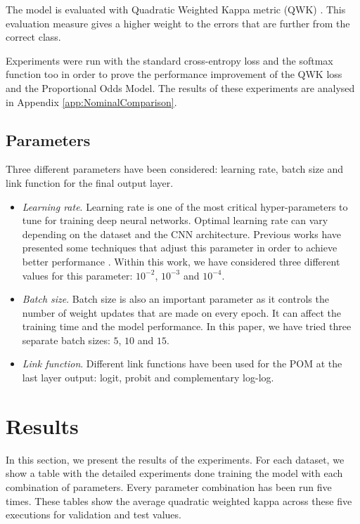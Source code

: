 \documentclass[10pt, a4paper, titlepage, twocolumn]{article}
\begin{document}
	The model is evaluated with Quadratic Weighted Kappa metric (QWK) \cite{ben2008comparison}. This evaluation measure gives a higher weight to the errors that are further from the correct class.
	
	 Experiments were run with the standard cross-entropy loss and the softmax function too in order to prove the performance improvement of the QWK loss and the Proportional Odds Model. The results of these experiments are analysed in Appendix \ref{app:NominalComparison}.
	
	\subsection{Parameters}
	Three different parameters have been considered: learning rate, batch size and link function for the final output layer.
	
	\begin{itemize}
		\item \textit{Learning rate}. Learning rate is one of the most critical hyper-parameters to tune for training deep neural networks. Optimal learning rate can vary depending on the dataset and the CNN architecture. Previous works have presented some techniques that adjust this parameter in order to achieve better performance \cite{smith2017cyclical}\cite{senior2013empirical}. Within this work, we have considered three different values for this parameter: $10^{-2}$, $10^{-3}$ and $10^{-4}$.
		\item \textit{Batch size}. Batch size is also an important parameter as it controls the number of weight updates that are made on every epoch. It can affect the training time and the model performance. In this paper, we have tried three separate batch sizes: $5$, $10$ and $15$.
		\item \textit{Link function}. Different link functions have been used for the POM at the last layer output: logit, probit and complementary log-log.
	\end{itemize}
	
	\section{Results}
	\label{sect:results}
	In this section, we present the results of the experiments. For each dataset, we show a table with the detailed experiments done training the model with each combination of parameters. Every parameter combination has been run five times. These tables show the average quadratic weighted kappa across these five executions for validation and test values.
	
\end{document}
